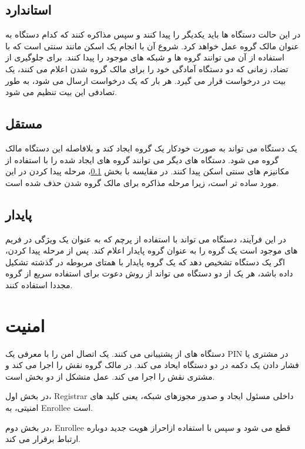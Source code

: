\subsection{استاندارد}\label{subsec:Standard}
در این حالت دستگاه ها باید یکدیگر را پیدا 
کنند و سپس مذاکره کنند که کدام دستگاه به عنوان  مالک گروه عمل خواهد کرد. شروع آن با انجام یک اسکن مانند 
 سنتی است که با استفاده از آن می توانند گروه ها و شبکه های
  موجود را پیدا کنند. برای جلوگیری از تضاد، زمانی که دو دستگاه آمادگی خود را برای مالک گروه شدن اعلام می کنند، یک بیت 
   در درخواست قرار می گیرد. هر بار که یک درخواست ارسال می شود، به طور تصادفی این بیت تنظیم می شود.
\subsection{مستقل}
یک دستگاه می تواند به صورت خودکار یک گروه  ایجاد کند و بلافاصله این دستگاه مالک گروه می شود. دستگاه های دیگر می توانند گروه های ایجاد شده را با استفاده از مکانیزم های سنتی اسکن پیدا کنند. در مقایسه با بخش \ref{subsec:Standard}، مرحله پیدا کردن در این مورد ساده تر است، زیرا مرحله مذاکره برای مالک گروه شدن حذف شده است.
\subsection{پایدار}
در این فرآیند، دستگاه می تواند با استفاده از پرچم 
که به عنوان یک ویژگی در فریم های 
موجود است یک گروه را به عنوان گروه پایدار اعلام کند.
پس از مرحله پیدا کردن، اگر یک دستگاه تشخیص دهد که یک گروه پایدار با همتای مربوطه در گذشته تشکیل داده باشد، هر یک از دو دستگاه می تواند از روش دعوت
 برای استفاده سریع از گروه مجددا استفاده کنند.
\section{امنیت}
دستگاه های
از 
 
پشتیبانی می کنند.
یک اتصال امن را با معرفی یک PIN در مشتری یا فشار دادن یک دکمه در دو دستگاه 
 ایحاد می کند.
 در 
مالک گروه نقش 
 را اجرا می کند و مشتری نقش 
 را اجرا می کند. عمل
  متشکل از دو بخش است. 
  
  در بخش اول، Registrar داخلی مسئول ایجاد و صدور مجوزهای شبکه، یعنی کلید های امنیتی، به Enrollee است. 
  
  در بخش دوم، Enrollee قطع می شود و سپس با استفاده ازاحراز هویت 
  جدید دوباره ارتباط  برقرار می کند.


